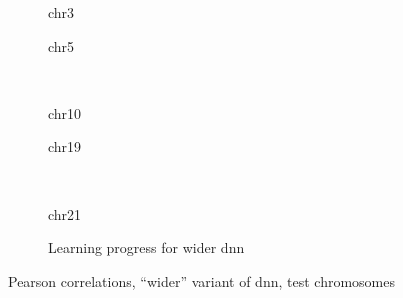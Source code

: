 \begin{figure}[p] %
    \begin{subfigure}{0.45\textwidth}
        \scriptsize
        \caption{chr3}
    \end{subfigure} \hfill
    \begin{subfigure}{0.45\textwidth}
        \scriptsize
        \caption{chr5}
    \end{subfigure}\\[5mm]
    \begin{subfigure}{0.45\textwidth}
        \scriptsize
        \caption{chr10}
    \end{subfigure}\hfill
    \begin{subfigure}{0.45\textwidth}
        \scriptsize
        \caption{chr19}
    \end{subfigure}\\[3mm]
    \centering
    \begin{subfigure}{0.45\textwidth}
        \scriptsize
        \caption{chr21}
    \end{subfigure}\hfill
    \begin{subfigure}{0.45\textwidth}
        \caption{Learning progress for wider \acrshort{dnn}} \label{fig:results:widerDNN_lossEpochs}
    \end{subfigure}
    \caption{Pearson correlations, ``wider'' variant of \acrshort{dnn},  test chromosomes}
    \label{fig:results:widerDNN_pearson}
\end{figure}

